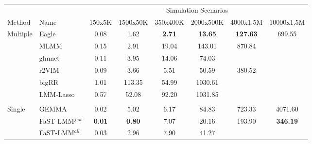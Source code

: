\documentclass{article}
\begin{document}
\begin{table}
\begin{tabular}{llcccccc}
              &           &  \multicolumn{6}{c}{Simulation Scenarios} \\ \cline{3-8}
 Method & Name & 150x5K & 1500x50K & 350x400K & 2000x500K & 4000x1.5M & 10000x1.5M \\ \hline
  Multiple & Eagle 	&	   0.08  &   1.62   &  \bf{2.7}1  &   \bf{13.65}   & \bf{127.63}  &   699.55  \\
               & MLMM 	&	   0.15    &  2.91    & 19.04  &  143.01  &  870.84  &     \\
               & glmnet 	&	  0.11     & 3.95    & 14.06    & 74.03    &        &    \\
               & r2VIM 	&	   0.09    &  3.66    &  5.51    & 50.59    & 380.52  &   \\ 
               & bigRR 	&	    1.01   & 113.35   &  54.99   & 1030.61  &        &     \\
               & LMM-Lasso 	&     0.57  &   52.08 &    92.20  & 1031.85 &           &     \\ \\
Single     &  GEMMA 	&      0.02  &   5.02   &   6.17  &   84.83   & 723.33  & 4071.60 \\
               & FaST-LMM$^{few}$ 	&    \bf{0.01}   &  \bf{0.80}   &   7.07   &  20.16   & 193.90   & \bf{346.19} \\ 
               & FaST-LMM$^{all}$   	&   0.03   & 2.96  &    7.90   &  41.27  &            &   \\ \hline
\end{tabular}

\end{table}
\end{document}
